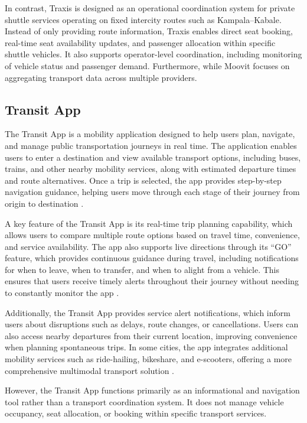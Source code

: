 In contrast, Traxis is designed as an operational coordination system for
private shuttle services operating on fixed intercity routes such as
Kampala–Kabale. Instead of only providing route information, Traxis enables
direct seat booking, real-time seat availability updates, and passenger
allocation within specific shuttle vehicles. It also supports operator-level
coordination, including monitoring of vehicle status and passenger demand.
Furthermore, while Moovit focuses on aggregating transport data across multiple
providers.


\subsection{Transit App}
The Transit App is a mobility application designed to help users plan, navigate,
and manage public transportation journeys in real time. The application enables
users to enter a destination and view available transport options, including
buses, trains, and other nearby mobility services, along with estimated
departure times and route alternatives. Once a trip is selected, the app
provides step-by-step navigation guidance, helping users move through each stage
of their journey from origin to destination
\cite{TransitApp2025}\cite{transit2026howtouse}.


A key feature of the Transit App is its real-time trip planning capability,
which allows users to compare multiple route options based on travel time,
convenience, and service availability. The app also supports live directions
through its “GO” feature, which provides continuous guidance during travel,
including notifications for when to leave, when to transfer, and when to alight
from a vehicle. This ensures that users receive timely alerts throughout their
journey without needing to constantly monitor the app
\cite{transit2026howtouse}.


Additionally, the Transit App provides service alert notifications, which inform
users about disruptions such as delays, route changes, or cancellations. Users
can also access nearby departures from their current location, improving
convenience when planning spontaneous trips. In some cities, the app integrates
additional mobility services such as ride-hailing, bikeshare, and e-scooters,
offering a more comprehensive multimodal transport solution
\cite{transit2026howtouse}.


However, the Transit App functions primarily as an informational and navigation
tool rather than a transport coordination system. It does not manage vehicle
occupancy, seat allocation, or booking within specific transport services.


